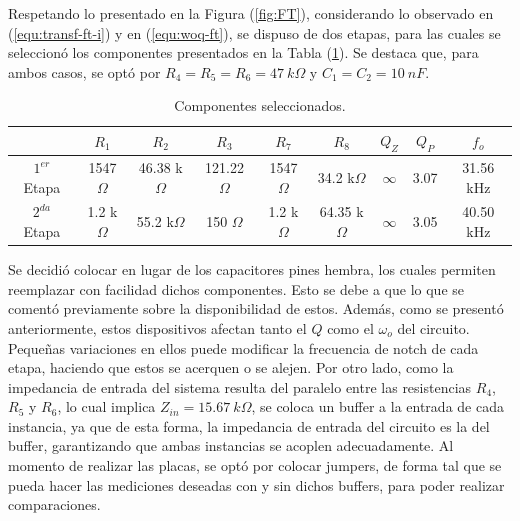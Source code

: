 Respetando lo presentado en la Figura (\ref{fig:FT}), considerando lo observado en (\ref{equ:transf-ft-i}) y en (\ref{equ:woq-ft}), se dispuso de dos etapas, para las cuales se seleccionó los componentes presentados en la Tabla (\ref{tab:componentes}). Se destaca que, para ambos casos, se optó por $R_4 = R_5 = R_6 = 47 \ k\Omega$ y $C_1 = C_2 = 10 \ nF$.

\begin{table}[H]
\centering
\begin{tabular}{ccccccccc}
\hline 
 & $R_1$ & $R_2$ & $R_3$ & $R_7$ & $R_8$ & $Q_Z$ & $Q_P$ & $f_o$ \\
 \hline
$1^{er}$ Etapa & 1547 $\Omega$ & 46.38 k$\Omega$ & 121.22 $\Omega$ & 1547 $\Omega$ & 34.2 k$\Omega$ & $\infty$ & 3.07 & 31.56 kHz \\
$2^{da}$ Etapa & 1.2 k$\Omega$ & 55.2 k$\Omega$ & 150 $\Omega$ & 1.2 k$\Omega$ & 64.35 k$\Omega$ & $\infty$ & 3.05 & 40.50 kHz \\
\hline
\end{tabular}
\caption{Componentes seleccionados.}
\label{tab:componentes}
\end{table} 

Se decidió colocar en lugar de los capacitores pines hembra, los cuales permiten reemplazar con facilidad dichos componentes. Esto se debe a que lo que se comentó previamente sobre la disponibilidad de estos. Además, como se presentó anteriormente, estos dispositivos afectan tanto el $Q$ como el $\omega_o$ del circuito. Pequeñas variaciones en ellos puede modificar la frecuencia de notch de cada etapa, haciendo que estos se acerquen o se alejen. Por otro lado, como la impedancia de entrada del sistema resulta del paralelo entre las resistencias $R_4$, $R_5$ y $R_6$, lo cual implica $Z_{in} = 15.67 \ k\Omega$, se coloca un buffer a la entrada de cada instancia, ya que de esta forma, la impedancia de entrada del circuito es la del buffer, garantizando que ambas instancias se acoplen adecuadamente. 
Al momento de realizar las placas, se optó por colocar jumpers, de forma tal que se pueda hacer las mediciones deseadas con y sin dichos buffers, para poder realizar comparaciones.   

